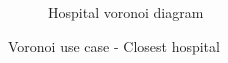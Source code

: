 \begin{center}
\begin{figure}[H]
\begin{subfigure}[b]{0.45\textwidth}
            \caption{Hospital voronoi diagram}
            \label{fig:hospitalVoronoi}
        \end{subfigure}
        \caption{Voronoi use case - Closest hospital}
        \label{fig:voronoiUseCase}
    \end{figure}
\end{center}